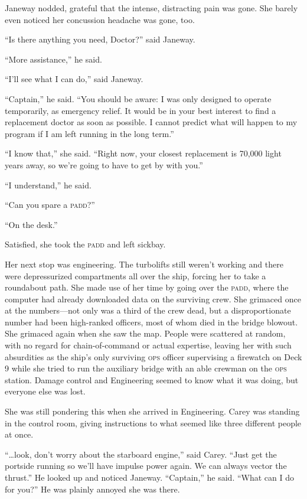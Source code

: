 \documentclass[twoside,letterpaper,12pt]{memoir}
\begin{document}
Janeway nodded, grateful that the intense, distracting pain was gone. She barely even noticed her concussion headache was gone, too.

``Is there anything you need, Doctor?'' said Janeway.

``More assistance,'' he said.

``I'll see what I can do,'' said Janeway.

``Captain,'' he said. ``You should be aware: I was only designed to operate temporarily, as emergency relief. It would be in your best interest to find a replacement doctor as soon as possible. I cannot predict what will happen to my program if I am left running in the long term.''

``I know that,'' she said. ``Right now, your closest replacement is 70,000 light years away, so we're going to have to get by with you.''

``I understand,'' he said.

``Can you spare a \textsc{padd}?''

``On the desk.''

Satisfied, she took the \textsc{padd} and left sickbay.

Her next stop was engineering. The turbolifts still weren't working and there were depressurized compartments all over the ship, forcing her to take a roundabout path. She made use of her time by going over the \textsc{padd}, where the computer had already downloaded data on the surviving crew. She grimaced once at the numbers---not only was a third of the crew dead, but a disproportionate number had been high-ranked officers, most of whom died in the bridge blowout. She grimaced again when she saw the map. People were scattered at random, with no regard for chain-of-command or actual expertise, leaving her with such absurdities as the ship's only surviving \textsc{ops} officer supervising a firewatch on Deck 9 while she tried to run the auxiliary bridge with an able crewman on the \textsc{ops} station. Damage control and Engineering seemed to know what it was doing, but everyone else was lost.

She was still pondering this when she arrived in Engineering. Carey was standing in the control room, giving instructions to what seemed like three different people at once.

``\ldots look, don't worry about the starboard engine,'' said Carey. ``Just get the portside running so we'll have impulse power again. We can always vector the thrust.'' He looked up and noticed Janeway. ``Captain,'' he said. ``What can I do for you?'' He was plainly annoyed she was there.
\end{document}
